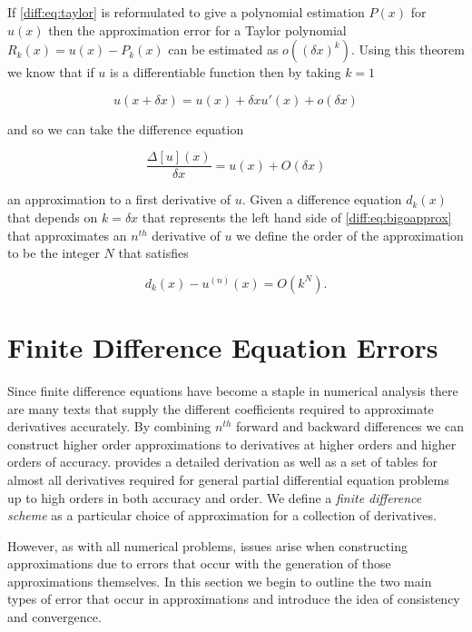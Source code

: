 \documentclass[../main.tex]{subfiles}
\begin{document}
  If \autoref{diff:eq:taylor} is reformulated to give a polynomial estimation $P(x)$ for $u(x)$ then the approximation error for a Taylor polynomial $R_k(x) = u(x) - P_k(x)$ can be estimated as $o((\delta x)^k)$. Using this theorem we know that if $u$ is a differentiable function then by taking $k = 1$

  \begin{equation}
    u(x + \delta x) = u(x) + \delta x u'(x) + o(\delta x)
  \end{equation}

  and so we can take the difference equation

  \begin{equation} \label{diff:eq:bigoapprox}
    \frac{\Delta[u](x)}{\delta x} = u(x) + O(\delta x)
  \end{equation}

  an approximation to a first derivative of $u$. Given a difference equation $d_k(x)$ that depends on $k = \delta x$ that represents the left hand side of \autoref{diff:eq:bigoapprox} that approximates an $n^{th}$ derivative of $u$ we define the order of the approximation to be the integer $N$ that satisfies

  \begin{equation}
    d_k(x) - u^{(n)}(x) = O(k^N).
  \end{equation}

  \section{Finite Difference Equation Errors}
  Since finite difference equations have become a staple in numerical analysis there are many texts that supply the different coefficients required to approximate derivatives accurately. By combining $n^{th}$ forward and backward differences we can construct higher order approximations to derivatives at higher orders and higher orders of accuracy. \cite{fornberg1988} provides a detailed derivation as well as a set of tables for almost all derivatives required for general partial differential equation problems up to high orders in both accuracy and order. We define a \emph{finite difference scheme} as a particular choice of approximation for a collection of derivatives.

  However, as with all numerical problems, issues arise when constructing approximations due to errors that occur with the generation of those approximations themselves. In this section we begin to outline the two main types of error that occur in approximations and introduce the idea of consistency and convergence.
\end{document}
